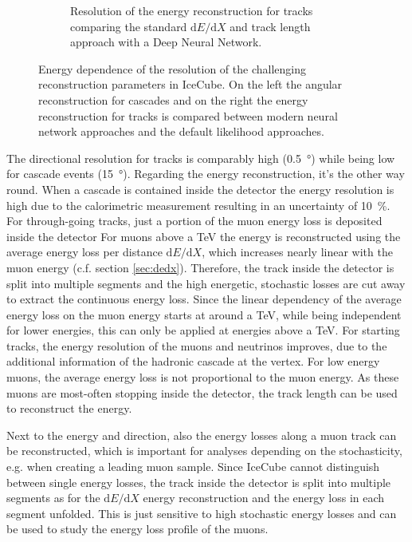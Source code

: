 \begin{figure}
\begin{subfigure}{0.43\textwidth}
        \caption{Resolution of the energy reconstruction for tracks comparing the standard $\mathrm{d}E/\mathrm{d}X$ and track length approach with a Deep Neural Network. \cite{Huennefeld17Master}}
        \label{fig:icecube_energy_resolution}
    \end{subfigure}
    \caption{Energy dependence of the resolution of the challenging reconstruction parameters in IceCube. On the left the angular reconstruction for cascades and on the right the energy reconstruction for tracks is compared between modern neural network approaches and the default likelihood approaches.}
    \label{fig:icecube_reco}
\end{figure}

The directional resolution for tracks is comparably high (\SI{0.5}{\degree}) while being low for cascade events (\SI{15}{\degree}).
Regarding the energy reconstruction, it's the other way round.
When a cascade is contained inside the detector the energy resolution is high due to the calorimetric measurement resulting in an uncertainty of \SI{10}{\%}.
For through-going tracks, just a portion of the muon energy loss is deposited inside the detector
For muons above a TeV the energy is reconstructed using the average energy loss per distance $\mathrm{d}E/\mathrm{d}X$, which increases nearly linear with the muon energy (c.f. section \ref{sec:dedx}).
Therefore, the track inside the detector is split into multiple segments and the high energetic, stochastic losses are cut away to extract the continuous energy loss.
Since the linear dependency of the average energy loss on the muon energy starts at around a TeV, while being independent for lower energies, this can only be applied at energies above a TeV.
For starting tracks, the energy resolution of the muons and neutrinos improves, due to the additional information of the hadronic cascade at the vertex.
For low energy muons, the average energy loss is not proportional to the muon energy.
As these muons are most-often stopping inside the detector, the track length can be used to reconstruct the energy.

Next to the energy and direction, also the energy losses along a muon track can be reconstructed, which is important for analyses depending on the stochasticity, e.g. when creating a leading muon sample.
Since IceCube cannot distinguish between single energy losses, the track inside the detector is split into multiple segments as for the $\mathrm{d}E/\mathrm{d}X$ energy reconstruction and the energy loss in each segment unfolded.
This is just sensitive to high stochastic energy losses and can be used to study the energy loss profile of the muons.

